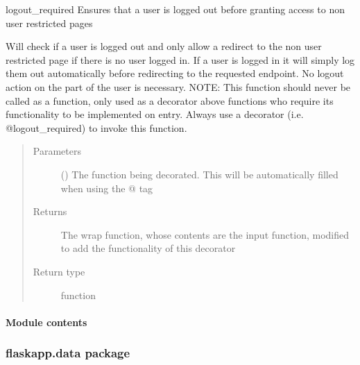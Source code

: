 \documentclass[letterpaper,10pt,english]{sphinxmanual}
\begin{document}
\begin{fulllineitems}
\label{\detokenize{flaskapp.config:flaskapp.config.decorators.logout_required}}
logout\_required Ensures that a user is logged out before granting access to non user restricted pages

Will check if a user is logged out and only allow a redirect to the non user restricted page if there is
no user logged in. If a user is logged in it will simply log them out automatically before redirecting to
the requested endpoint. No logout action on the part of the user is necessary.
NOTE: This function should never be called as a function, only used as a decorator above functions
who require its functionality to be implemented on entry. Always use a decorator (i.e. @logout\_required)
to invoke this function.
\begin{quote}\begin{description}
\item[{Parameters}] \leavevmode
{} () \textendash{} The function being decorated. This will be automatically filled when using the @ tag

\item[{Returns}] \leavevmode
The wrap function, whose contents are the input function, modified to add the functionality of this decorator

\item[{Return type}] \leavevmode
function

\end{description}\end{quote}

\end{fulllineitems}



\paragraph{Module contents}
\label{\detokenize{flaskapp.config:module-flaskapp.config}}\label{\detokenize{flaskapp.config:module-contents}}

\subsubsection{flaskapp.data package}
\label{\detokenize{flaskapp.data:flaskapp-data-package}}\label{\detokenize{flaskapp.data::doc}}
\end{document}
